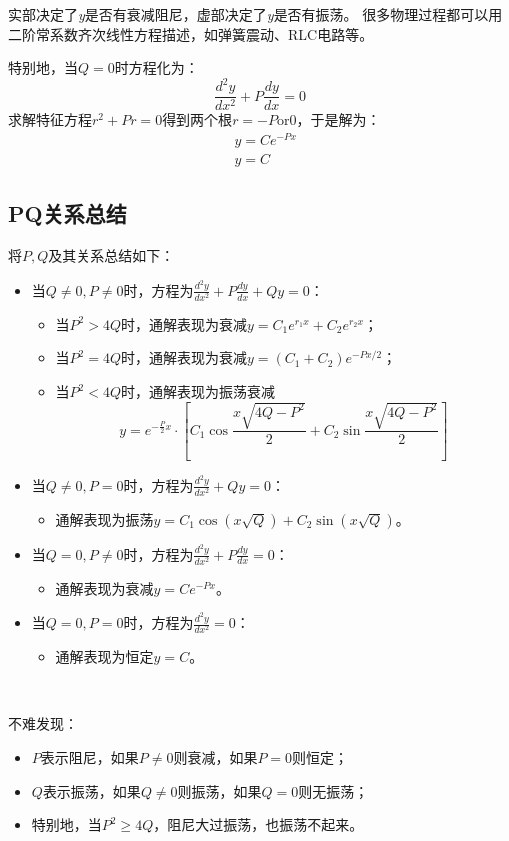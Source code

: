 实部决定了{\it y}是否有衰减阻尼，虚部决定了{\it y}是否有振荡。
很多物理过程都可以用二阶常系数齐次线性方程描述，如弹簧震动、RLC电路等。

特别地，当$Q=0$时方程化为：
\[
\frac{d^2y}{dx^2}+P\frac{dy}{dx}=0
\]
求解特征方程$r^2+Pr=0$得到两个根$r=-P\mathrm{or}0$，于是解为：
\begin{align*}
&y=Ce^{-Px} \\
&y=C
\end{align*}

\subsection{PQ关系总结}

将$P,Q$及其关系总结如下：
\begin{itemize}
    \item 当$Q\ne 0,P\ne 0$时，方程为$\frac{d^2y}{dx^2}+P\frac{dy}{dx}+Qy=0$：
    \begin{itemize}
        \item 当$P^2>4Q$时，通解表现为衰减$y=C_1e^{r_1x}+C_2e^{r_2x}$；
        \item 当$P^2=4Q$时，通解表现为衰减$y=\left( C_1+C_2 \right) e^{-Px/2}$；
        \item 当$P^2<4Q$时，通解表现为振荡衰减
        \[
        y=e^{-\frac{P}{2}x}\cdot \left[ C_1\cos \frac{x\sqrt{4Q-P^2}}{2}+C_2\sin \frac{x\sqrt{4Q-P^2}}{2} \right]
        \]
    \end{itemize}
    \item 当$Q\ne 0,P=0$时，方程为$\frac{d^2y}{dx^2}+Qy=0$：
    \begin{itemize}
        \item 通解表现为振荡$y=C_1\cos \left( x\sqrt{Q} \right) +C_2\sin \left( x\sqrt{Q} \right) $。
    \end{itemize}
    \item 当$Q=0,P\ne 0$时，方程为$\frac{d^2y}{dx^2}+P\frac{dy}{dx}=0$：
    \begin{itemize}
        \item 通解表现为衰减$y=Ce^{-Px}$。
    \end{itemize}
    \item 当$Q=0,P=0$时，方程为$\frac{d^2y}{dx^2}=0$：
    \begin{itemize}
        \item 通解表现为恒定$y=C$。
    \end{itemize}
\end{itemize}

~

不难发现：
\begin{itemize}
    \item $P$表示阻尼，如果$P\ne 0$则衰减，如果$P=0$则恒定；
    \item $Q$表示振荡，如果$Q\ne 0$则振荡，如果$Q=0$则无振荡；
    \item 特别地，当$P^2\geqslant 4Q$，阻尼大过振荡，也振荡不起来。
\end{itemize}




